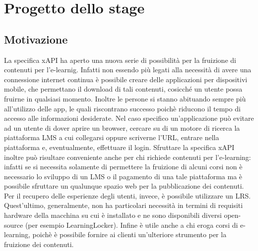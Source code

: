 \documentclass[../Tesi.tex]{subfiles}
\begin{document}
\section{Progetto dello stage}
	\subsection{Motivazione}
	La specifica xAPI ha aperto una nuova serie di possibilità per la fruizione di contenuti per l'e-learnig. Infatti non essendo più legati alla necessità di avere una connessione internet continua è possibile creare delle applicazioni per dispositivi mobile, che permettano il download di tali contenuti, cosicché un utente possa fruirne in qualsiasi momento. Inoltre le persone si stanno abituando sempre più all'utilizzo delle app, le quali riscontrano successo poichè riducono il tempo di accesso alle informazioni desiderate. Nel caso specifico un'applicazione può evitare ad un utente di dover aprire un browser, cercare su di un motore di ricerca la piattaforma LMS a cui collegarsi oppure scriverne l'URL, entrare nella piattaforma e, eventualmente, effettuare il login. Sfruttare la specifica xAPI inoltre può risultare conveniente anche per chi richiede contenuti per l’e-learning: infatti se si necessita solamente di permettere la fruizione di alcuni corsi non è necessario lo sviluppo di un LMS o il pagamento di una tale piattaforma ma è possibile sfruttare un qualunque spazio web per la pubblicazione dei contenuti. Per il recupero delle esperienze degli utenti, invece, è possibile utilizzare un LRS. Quest'ultimo, generalmente, non ha particolari necessità in termini di requisiti hardware della macchina su cui è installato e ne sono disponibili diversi open-source (per esempio LearningLocker). Infine è utile anche a chi eroga corsi di e-learning, poichè è possibile fornire ai clienti un’ulteriore strumento per la fruizione dei contenuti.
\end{document}
